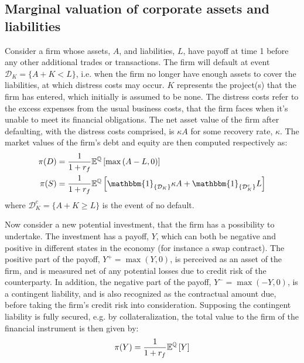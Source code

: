 \documentclass[../main.tex]{subfiles}
\begin{document}
    \subsection{Marginal valuation of corporate assets and liabilities}
        Consider a firm whose assets, $A$, and liabilities, $L$, have payoff at time 1 before any other additional trades or transactions.        
        The firm will default at event $\mathcal{D}_K=\{A + K<L\}$, i.e. when the firm no longer have enough assets to cover the liabilities, at which distress costs may occur.
        $K$ represents the project(s) that the firm has entered, which initially is assumed to be none.
        The distress costs refer to the excess expenses from the usual business costs, that the firm faces when it's unable to meet its financial obligations.
        The net asset value of the firm after defaulting, with the distress costs comprised, is $\kappa A$ for some recovery rate, $\kappa$.
        The market values of the firm's debt and equity are then computed respectively as:
        \begin{align}
            \pi(D) &= \discountfactor \mathbb{E}^{\mathbb{Q}}\left[\max\left(A-L,0\right)\right]\\
            \pi(S) &= \discountfactor \mathbb{E}^{\mathbb{Q}}\left[\mathbbm{1}_{\{\mathcal{D}_{K}\}}\kappa A + \mathbbm{1}_{\{\mathcal{D}_{K}^c\}}L\right]
        \end{align}
        where $\mathcal{D}_{K}^c = \{A + K \geq L\}$ is the event of no default.

        Now consider a new potential investment, that the firm has a possibility to undertake.
        The investment has a payoff, $Y$, which can both be negative and positive in different states in the economy (for instance a swap contract).
        The positive part of the payoff, $Y^{+}=\max\left(Y,0\right)$, is perceived as an asset of the firm, and is measured net of any potential losses due to credit risk of the counterparty.
        In addition, the negative part of the payoff, $Y^{-} = \max \left(-Y,0\right)$, is a contingent liability, and is also recognized as the contractual amount due, before taking the firm's credit risk into consideration.
        Supposing the contingent liability is fully secured, e.g. by collateralization, the total value to the firm of the financial instrument is then given by:
        \begin{equation}
            \pi(Y) = \frac{1}{1 + r_{f}} \mathbb{E}^{\mathbb{Q}} \left[Y\right]
        \end{equation}
\end{document}
